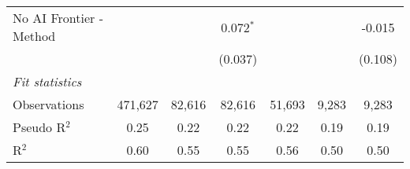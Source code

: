 \begin{tabular}{lcccccc}
   No AI Frontier - Method &               &               & 0.072$^{*}$   &               &               & -0.015\\   
                           &               &               & (0.037)       &               &               & (0.108)\\   
   \midrule
   \emph{Fit statistics}\\
   Observations            & 471,627       & 82,616        & 82,616        & 51,693        & 9,283         & 9,283\\  
   Pseudo R$^2$            & 0.25          & 0.22          & 0.22          & 0.22          & 0.19          & 0.19\\  
   R$^2$                   & 0.60          & 0.55          & 0.55          & 0.56          & 0.50          & 0.50\\  
   

\end{tabular}
